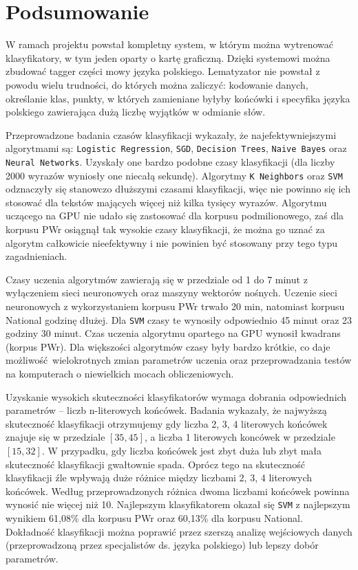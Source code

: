 \section{Podsumowanie}

W ramach projektu powstał kompletny system, w którym można wytrenować klasyfikatory, w tym jeden oparty o kartę graficzną. Dzięki systemowi można zbudować tagger części mowy języka polskiego. Lematyzator nie powstał z powodu wielu trudności, do których można zaliczyć: kodowanie danych, określanie klas, punkty, w których zamieniane byłyby końcówki i specyfika języka polskiego zawierająca dużą liczbę wyjątków w odmianie słów.

Przeprowadzone badania czasów klasyfikacji wykazały, że najefektywniejszymi algorytmami są: \texttt{Logistic Regression}, \texttt{SGD}, \texttt{Decision Trees}, \texttt{Naive Bayes} oraz \texttt{Neural Networks}. Uzyskały one bardzo podobne czasy klasyfikacji (dla liczby 2000 wyrazów wyniosły one niecałą sekundę). Algorytmy \texttt{K Neighbors} oraz \texttt{SVM} odznaczyły się stanowczo dłuższymi czasami klasyfikacji, więc nie powinno się ich stosować dla tekstów mających więcej niż kilka tysięcy wyrazów. Algorytmu uczącego na GPU nie udało się zastosować dla korpusu podmilionowego, zaś dla korpusu PWr osiągnął tak wysokie czasy klasyfikacji, że można go uznać za algorytm całkowicie nieefektywny i nie powinien być stosowany przy tego typu zagadnieniach.

Czasy uczenia algorytmów zawierają się w przedziale od 1 do 7 minut z wyłączeniem sieci neuronowych oraz maszyny wektorów nośnych. Uczenie sieci neuronowych z wykorzystaniem korpusu PWr trwało 20 min, natomiast korpusu National godzinę dłużej. Dla \texttt{SVM} czasy te wynosiły odpowiednio 45 minut oraz 23 godziny 30 minut. Czas uczenia algorytmu opartego na GPU wynosił kwadrans (korpus PWr). Dla większości algorytmów czasy były bardzo krótkie, co daje możliwość wielokrotnych zmian parametrów uczenia oraz przeprowadzania testów na komputerach o niewielkich mocach obliczeniowych.

Uzyskanie wysokich skuteczności klasyfikatorów wymaga dobrania odpowiednich parametrów -- liczb n-literowych końcówek. Badania wykazały, że najwyższą skuteczność klasyfikacji otrzymujemy gdy liczba 2, 3, 4 literowych końcówek znajuje się w przedziale $[35, 45]$, a liczba 1 literowych koncówek w przedziale $[15, 32]$. W przypadku, gdy liczba końcówek jest zbyt duża lub zbyt mała skuteczność klasyfikacji gwałtownie spada. Oprócz tego na skuteczność klasyfikacji źle wpływają duże różnice między liczbami 2, 3, 4 literowych końcówek. Według przeprowadzonych różnica dwoma liczbami końcówek powinna wynosić nie więcej niż 10. Najlepszym klasyfikatorem okazał się \texttt{SVM} z najlepszym wynikiem 61,08\% dla korpusu PWr oraz 60,13\% dla korpusu National. Dokładność klasyfikacji można poprawić przez szerszą analizę wejściowych danych (przeprowadzoną przez specjalistów ds. języka polskiego) lub lepszy dobór parametrów.  

